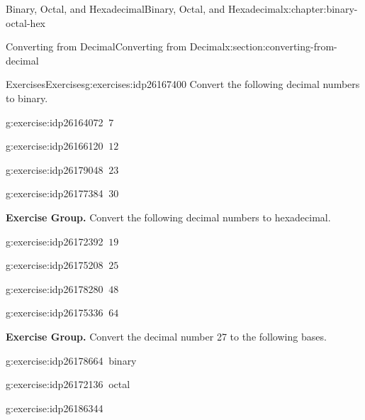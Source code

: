 \documentclass[twoside,10pt,]{book}
\numberwithin{equation}{section}
\begin{document}
\begin{chapterptx}{Binary, Octal, and Hexadecimal}{}{Binary, Octal, and Hexadecimal}{}{}{x:chapter:binary-octal-hex}
\begin{sectionptx}{Converting from Decimal}{}{Converting from Decimal}{}{}{x:section:converting-from-decimal}
\begin{exercises-subsection}{Exercises}{}{Exercises}{}{}{g:exercises:idp26167400}
Convert the following decimal numbers to binary.\begin{exercisegroup}
\begin{divisionexerciseeg}{5}{}{}{g:exercise:idp26164072}%
\(\ 7\)\end{divisionexerciseeg}%
\begin{divisionexerciseeg}{6}{}{}{g:exercise:idp26166120}%
\(\ 12\)\end{divisionexerciseeg}%
\begin{divisionexerciseeg}{7}{}{}{g:exercise:idp26179048}%
\(\ 23\)\end{divisionexerciseeg}%
\begin{divisionexerciseeg}{8}{}{}{g:exercise:idp26177384}%
\(\ 30\)\end{divisionexerciseeg}%
\end{exercisegroup}
\par\medskip\noindent
\par\medskip\noindent%
\textbf{Exercise Group.}\space\space%
Convert the following decimal numbers to hexadecimal.\begin{exercisegroup}
\begin{divisionexerciseeg}{9}{}{}{g:exercise:idp26172392}%
\(\ 19\)\end{divisionexerciseeg}%
\begin{divisionexerciseeg}{10}{}{}{g:exercise:idp26175208}%
\(\ 25\)\end{divisionexerciseeg}%
\begin{divisionexerciseeg}{11}{}{}{g:exercise:idp26178280}%
\(\ 48\)\end{divisionexerciseeg}%
\begin{divisionexerciseeg}{12}{}{}{g:exercise:idp26175336}%
\(\ 64\)\end{divisionexerciseeg}%
\end{exercisegroup}
\par\medskip\noindent
\par\medskip\noindent%
\textbf{Exercise Group.}\space\space%
Convert the decimal number 27 to the following bases.\begin{exercisegroup}
\begin{divisionexerciseeg}{13}{}{}{g:exercise:idp26178664}%
\(\ \)binary\end{divisionexerciseeg}%
\begin{divisionexerciseeg}{14}{}{}{g:exercise:idp26172136}%
\(\ \)octal\end{divisionexerciseeg}%
\begin{divisionexerciseeg}{15}{}{}{g:exercise:idp26186344}%

\end{divisionexerciseeg}
\end{exercisegroup}
\end{exercises-subsection}
\end{sectionptx}
\end{chapterptx}
\end{document}
